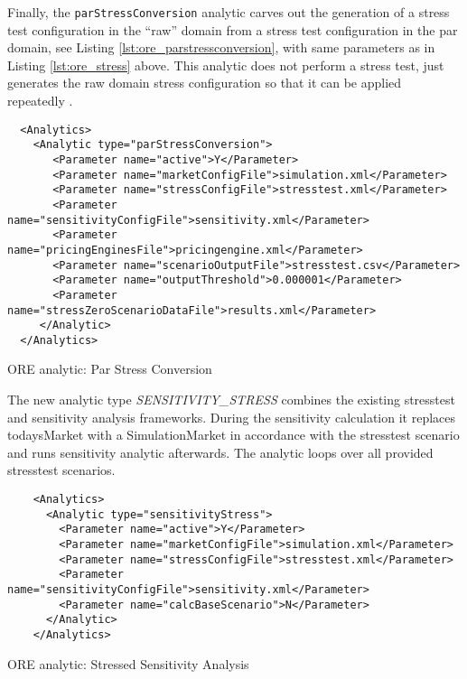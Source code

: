 {Finally, the {\tt parStressConversion} analytic carves out the generation of a stress test configuration in the ``raw'' domain from a stress test configuration in the par domain, see Listing
\ref{lst:ore_parstressconversion}, with same parameters as in Listing \ref{lst:ore_stress} above. This analytic does not perform a stress test, just generates the raw domain stress configuration so that it can be applied repeatedly .

\begin{listing}[H]
\begin{verbatim}
  <Analytics>
    <Analytic type="parStressConversion">
       <Parameter name="active">Y</Parameter>
       <Parameter name="marketConfigFile">simulation.xml</Parameter>
       <Parameter name="stressConfigFile">stresstest.xml</Parameter>
       <Parameter name="sensitivityConfigFile">sensitivity.xml</Parameter>
       <Parameter name="pricingEnginesFile">pricingengine.xml</Parameter>
       <Parameter name="scenarioOutputFile">stresstest.csv</Parameter>
       <Parameter name="outputThreshold">0.000001</Parameter>
       <Parameter name="stressZeroScenarioDataFile">results.xml</Parameter>
     </Analytic>
  </Analytics>
\end{verbatim}
\caption{ORE analytic: Par Stress Conversion}
\label{lst:ore_parstressconversion}
\end{listing}

The new analytic type \emph{SENSITIVITY\_STRESS} combines the existing stresstest and sensitivity analysis frameworks. During the sensitivity calculation it replaces todaysMarket with a SimulationMarket in accordance with the stresstest scenario and runs sensitivity analytic afterwards. The analytic loops over all provided stresstest scenarios.

\begin{listing}[H]
  \begin{verbatim}
    <Analytics>
      <Analytic type="sensitivityStress">
        <Parameter name="active">Y</Parameter>
        <Parameter name="marketConfigFile">simulation.xml</Parameter>
        <Parameter name="stressConfigFile">stresstest.xml</Parameter>
        <Parameter name="sensitivityConfigFile">sensitivity.xml</Parameter>
        <Parameter name="calcBaseScenario">N</Parameter>
      </Analytic>
    </Analytics>
  \end{verbatim}
  \caption{ORE analytic: Stressed Sensitivity Analysis}
  \label{lst:ore_sensistress}
  \end{listing}

}
